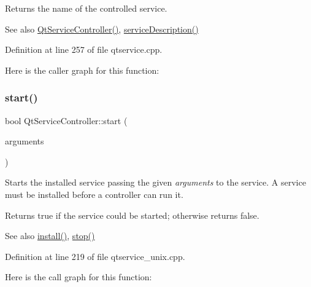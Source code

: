 Returns the name of the controlled service.

\begin{DoxySeeAlso}{See also}
\mbox{\hyperlink{class_qt_service_controller_ab5c5bb7d168d2e59f0784ded380d7adf}{Qt\+Service\+Controller()}}, \mbox{\hyperlink{class_qt_service_controller_a503c0fadf098b4c5bbccbb2a57f911e2}{service\+Description()}} 
\end{DoxySeeAlso}


Definition at line 257 of file qtservice.\+cpp.

Here is the caller graph for this function\+:
\mbox{\label{class_qt_service_controller_a70f274d3f4f5a5fea60b8fd7331b31fb}} 
\subsubsection{\texorpdfstring{start()}{start()}\hspace{0.1cm}{\footnotesize\ttfamily [1/2]}}
{\footnotesize\ttfamily bool Qt\+Service\+Controller\+::start (\begin{DoxyParamCaption}\item[{const Q\+String\+List \&}]{arguments }\end{DoxyParamCaption})}

Starts the installed service passing the given {\itshape arguments} to the service. A service must be installed before a controller can run it.

Returns true if the service could be started; otherwise returns false.

\begin{DoxySeeAlso}{See also}
\mbox{\hyperlink{class_qt_service_controller_a7e2b85e911ff152557dd25959e76094b}{install()}}, \mbox{\hyperlink{class_qt_service_controller_ad06afa647666769e309474b18bf7cf90}{stop()}} 
\end{DoxySeeAlso}


Definition at line 219 of file qtservice\+\_\+unix.\+cpp.

Here is the call graph for this function\+:
\mbox{\label{class_qt_service_controller_a5e9d6da5081d70f31611456d0ef0687e}} 
